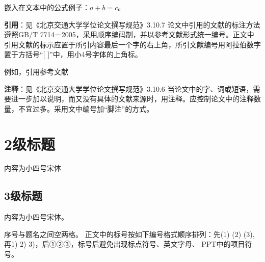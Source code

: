 嵌入在文本中的公式例子：$a + b = c$。



\textbf{引用}：见《北京交通大学学位论文撰写规范》3.10.7
论文中引用的文献的标注方法遵照GB/T 7714－2005，采用顺序编码制，并以参考文献形式统一编号。正文中引用文献的标示应置于所引内容最后一个字的右上角，所引文献编号用阿拉伯数字置于方括号“[ ]”中，用小4号字体的上角标。

例如，引用参考文献\cite{MATSUMURA2017566,fang2015survey}


\textbf{注释}：见《北京交通大学学位论文撰写规范》3.10.6
当论文中的字、词或短语，需要进一步加以说明，而又没有具体的文献来源时，用注释。应控制论文中的注释数量，不宜过多。采用文中编号加“脚注”的方式。



\section{2级标题}
内容为小四号宋体


\subsection{3级标题}
内容为小四号宋体。

序号与题名之间空两格。
正文中的标号按如下编号格式顺序排列：先(1) (2) (3), 再1) 2) 3)，后①②③，标号后避免出现标点符号、英文字母、 PPT中的项目符号。








%


